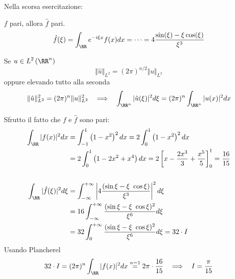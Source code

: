 \Soluzione

Nella scorsa esercitazione:

$f$ pari, allora $\hat{f}$ pari.
\begin{equation*}
\hat{f}(\xi) = \int_{\RR} e^{- i\xi x} f(x) dx = \cdots = 4\frac{\sin(\xi) - \xi \cos(\xi)}{\xi^{3}}
\end{equation*}
\begin{thm}
 Se $\displaystyle u\in L^{2}\left(\RR^{n}\right)$
\begin{equation*}
\Vert \hat{u}\Vert_{L^{2}} = (2\pi)^{n/2}\Vert u\Vert_{L^{2}}
\end{equation*}
oppure elevando tutto alla seconda
\begin{equation*}
\Vert \hat{u}\Vert^{2}_{L^{2}} = (2\pi)^{n}\Vert u\Vert^{2}_{L^{2}} \ \ \implies \ \ \int_{\RR^{n}}| \hat{u}(\xi)|^{2} d\xi = (2\pi)^{n}\int_{\RR^{n}}| u(x)|^{2} dx
\end{equation*}
\end{thm}
Sfrutto il fatto che $f$ e $\hat{f}$ sono pari:
\begin{align*}
\int_{\RR}| f(x)|^{2} dx & = \int^{1}_{- 1}\left(1 - x^{2}\right)^{2} dx = 2\int^{1}_{0}\left(1 - x^{2}\right)^{2} dx\\
 & = 2\int^{1}_{0}\left(1 - 2x^2 + x^{4}\right) dx = 2\left[ x - \frac{2x^{3}}{3} + \frac{x^{5}}{5}\right]^{1}_{0} = \frac{16}{15}\\
 & \\
\int_{\RR}| \hat{f}(\xi)|^{2} d\xi & = \int^{+ \infty}_{- \infty}\left| 4\frac{(\sin \xi - \xi \ \cos \xi)}{\xi^{3}}\right|^{2} d\xi \\
 & = 16\int^{+ \infty}_{- \infty}\frac{(\sin \xi - \xi \ \cos \xi)^{2}}{\xi^{6}} d\xi \\
 & = 32\int^{+ \infty}_{0}\frac{(\sin \xi - \xi \ \cos \xi)^{2}}{\xi^{6}} d\xi = 32 \cdot I
\end{align*}
Usando Plancherel
\begin{equation*}
32 \cdot I = (2\pi)^{n}\int_{\RR}| f(x)|^{2} dx\overset{n = 1}{=} 2\pi \cdot \frac{16}{15} \ \ \implies \ \ I = \frac{\pi}{15}
\end{equation*}

\Soluzione

